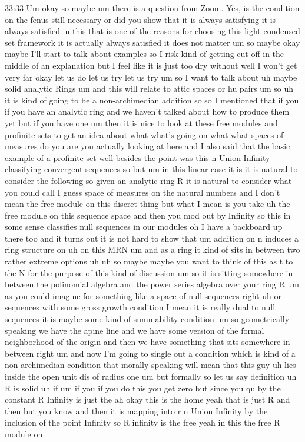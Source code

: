 \begin{unfinished}{33:33}
Um okay so maybe um there is a question from Zoom. Yes, is the condition on the fenus still necessary or did you show that it is always satisfying it is always satisfied in this that is one of the reasons for choosing this light condensed set framework it is actually always satisfied it does not matter um so maybe okay maybe I'll start to talk about examples so I risk kind of getting cut off in the middle of an explanation but I feel like it is just too dry without well I won't get very far okay let us do let us try let us try um so I want to talk about uh maybe solid analytic Rings um and this will relate to attic spaces or hu pairs um so uh it is kind of going to be a non-archimedian addition so so I mentioned that if you if you have an analytic ring and we haven't talked about how to produce them yet but if you have one um then it is nice to look at these free modules and profinite sets to get an idea about what what's going on what what spaces of measures do you are you actually looking at here and I also said that the basic example of a profinite set well besides the point was this n Union Infinity classifying convergent sequences so but um in this linear case it is it is natural to consider the following so given an analytic ring R it is natural to consider what you could call I guess space of measures on the natural numbers and I don't mean the free module on this discret thing but what I mean is you take uh the free module on this sequence space and then you mod out by Infinity so this in some sense classifies null sequences in our modules oh I have a backboard up there too and it turns out it is not hard to show that um addition on n induces a ring structure on uh on this MRN um and as a ring it kind of sits in between two rather extreme options uh uh so maybe maybe you want to think of this as t to the N for the purpose of this kind of discussion um so it is sitting somewhere in between the polinomial algebra and the power series algebra over your ring R um as you could imagine for something like a space of null sequences right uh or sequences with some gross growth condition I mean it is really dual to null sequences it is maybe some kind of summability condition um so geometrically speaking we have the apine line and we have some version of the formal neighborhood of the origin and then we have something that sits somewhere in between right um and now I'm going to single out a condition which is kind of a non-archimedian condition that morally speaking will mean that this guy uh lies inside the open unit dis of radius one um but formally so let us say definition uh R is solid uh if um if you if you do this you get zero but since you qu by the constant R Infinity is just the ah okay this is the home yeah that is just R and then but you know and then it is mapping into r n Union Infinity by the inclusion of the point Infinity so R infinity is the free yeah in this the free R module on


\end{unfinished}
